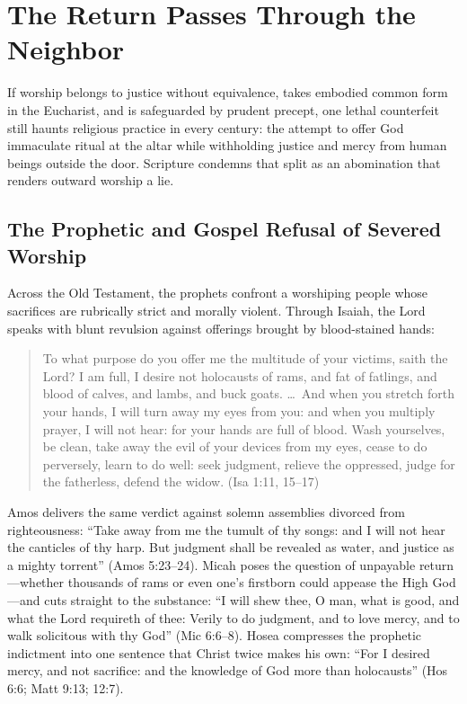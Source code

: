 \section{The Return Passes Through the Neighbor}

If worship belongs to justice without equivalence, takes embodied common form in the Eucharist, and is safeguarded by prudent precept, one lethal counterfeit still haunts religious practice in every century: the attempt to offer God immaculate ritual at the altar while withholding justice and mercy from human beings outside the door. Scripture condemns that split as an abomination that renders outward worship a lie.

\subsection{The Prophetic and Gospel Refusal of Severed Worship}

Across the Old Testament, the prophets confront a worshiping people whose sacrifices are rubrically strict and morally violent. Through Isaiah, the Lord speaks with blunt revulsion against offerings brought by blood-stained hands:

\begin{quote}
To what purpose do you offer me the multitude of your victims, saith the Lord? I am full, I desire not holocausts of rams, and fat of fatlings, and blood of calves, and lambs, and buck goats. \dots\ And when you stretch forth your hands, I will turn away my eyes from you: and when you multiply prayer, I will not hear: for your hands are full of blood. Wash yourselves, be clean, take away the evil of your devices from my eyes, cease to do perversely, learn to do well: seek judgment, relieve the oppressed, judge for the fatherless, defend the widow. (Isa 1:11, 15--17)
\end{quote}

Amos delivers the same verdict against solemn assemblies divorced from righteousness: ``Take away from me the tumult of thy songs: and I will not hear the canticles of thy harp. But judgment shall be revealed as water, and justice as a mighty torrent'' (Amos 5:23--24). Micah poses the question of unpayable return---whether thousands of rams or even one's firstborn could appease the High God---and cuts straight to the substance: ``I will shew thee, O man, what is good, and what the Lord requireth of thee: Verily to do judgment, and to love mercy, and to walk solicitous with thy God'' (Mic 6:6--8). Hosea compresses the prophetic indictment into one sentence that Christ twice makes his own: ``For I desired mercy, and not sacrifice: and the knowledge of God more than holocausts'' (Hos 6:6; Matt 9:13; 12:7).

